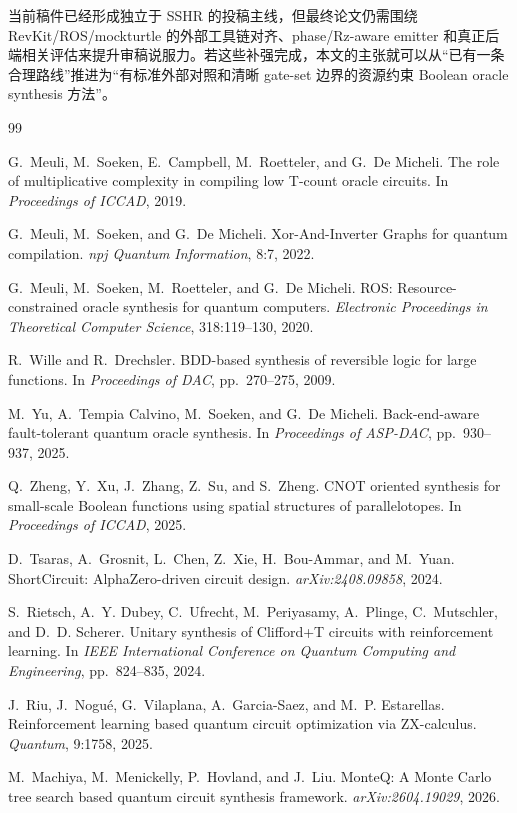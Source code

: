\documentclass[UTF8,fontset=macnew,11pt]{ctexart}
\begin{document}
当前稿件已经形成独立于 SSHR 的投稿主线，但最终论文仍需围绕 RevKit/ROS/mockturtle 的外部工具链对齐、phase/Rz-aware emitter 和真正后端相关评估来提升审稿说服力。若这些补强完成，本文的主张就可以从“已有一条合理路线”推进为“有标准外部对照和清晰 gate-set 边界的资源约束 Boolean oracle synthesis 方法”。

\begin{thebibliography}{99}

G.~Meuli, M.~Soeken, E.~Campbell, M.~Roetteler, and G.~De Micheli.
\newblock The role of multiplicative complexity in compiling low T-count oracle circuits.
\newblock In \emph{Proceedings of ICCAD}, 2019.

G.~Meuli, M.~Soeken, and G.~De Micheli.
\newblock Xor-And-Inverter Graphs for quantum compilation.
\newblock \emph{npj Quantum Information}, 8:7, 2022.

G.~Meuli, M.~Soeken, M.~Roetteler, and G.~De Micheli.
\newblock ROS: Resource-constrained oracle synthesis for quantum computers.
\newblock \emph{Electronic Proceedings in Theoretical Computer Science}, 318:119--130, 2020.

R.~Wille and R.~Drechsler.
\newblock BDD-based synthesis of reversible logic for large functions.
\newblock In \emph{Proceedings of DAC}, pp.~270--275, 2009.

M.~Yu, A.~Tempia Calvino, M.~Soeken, and G.~De Micheli.
\newblock Back-end-aware fault-tolerant quantum oracle synthesis.
\newblock In \emph{Proceedings of ASP-DAC}, pp.~930--937, 2025.

Q.~Zheng, Y.~Xu, J.~Zhang, Z.~Su, and S.~Zheng.
\newblock CNOT oriented synthesis for small-scale Boolean functions using spatial structures of parallelotopes.
\newblock In \emph{Proceedings of ICCAD}, 2025.

D.~Tsaras, A.~Grosnit, L.~Chen, Z.~Xie, H.~Bou-Ammar, and M.~Yuan.
\newblock ShortCircuit: AlphaZero-driven circuit design.
\newblock \emph{arXiv:2408.09858}, 2024.

S.~Rietsch, A.~Y. Dubey, C.~Ufrecht, M.~Periyasamy, A.~Plinge, C.~Mutschler, and D.~D. Scherer.
\newblock Unitary synthesis of Clifford+T circuits with reinforcement learning.
\newblock In \emph{IEEE International Conference on Quantum Computing and Engineering}, pp.~824--835, 2024.

J.~Riu, J.~Nogu{\'e}, G.~Vilaplana, A.~Garcia-Saez, and M.~P. Estarellas.
\newblock Reinforcement learning based quantum circuit optimization via ZX-calculus.
\newblock \emph{Quantum}, 9:1758, 2025.

M.~Machiya, M.~Menickelly, P.~Hovland, and J.~Liu.
\newblock MonteQ: A Monte Carlo tree search based quantum circuit synthesis framework.
\newblock \emph{arXiv:2604.19029}, 2026.

\end{thebibliography}
\end{document}
